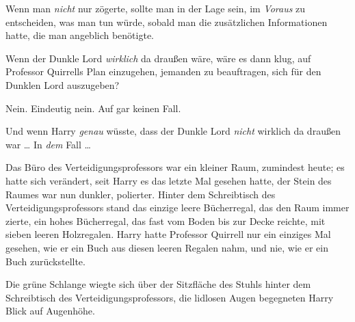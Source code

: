 Wenn man \emph{nicht} nur zögerte, sollte man in der Lage sein, im \emph{Voraus} zu entscheiden, was man tun würde, sobald man die zusätzlichen Informationen hatte, die man angeblich benötigte.

Wenn der Dunkle Lord \emph{wirklich} da draußen wäre, wäre es dann klug, auf Professor Quirrells Plan einzugehen, jemanden zu beauftragen, sich für den Dunklen Lord auszugeben?

Nein. Eindeutig nein. Auf gar keinen Fall.

Und wenn Harry \emph{genau} wüsste, dass der Dunkle Lord \emph{nicht} wirklich da draußen war … In \emph{dem} Fall …

Das Büro des Verteidigungsprofessors war ein kleiner Raum, zumindest heute; es hatte sich verändert, seit Harry es das letzte Mal gesehen hatte, der Stein des Raumes war nun dunkler, polierter. Hinter dem Schreibtisch des Verteidigungsprofessors stand das einzige leere Bücherregal, das den Raum immer zierte, ein hohes Bücherregal, das fast vom Boden bis zur Decke reichte, mit sieben leeren Holzregalen. Harry hatte Professor Quirrell nur ein einziges Mal gesehen, wie er ein Buch aus diesen leeren Regalen nahm, und nie, wie er ein Buch zurückstellte.

Die grüne Schlange wiegte sich über der Sitzfläche des Stuhls hinter dem Schreibtisch des Verteidigungsprofessors, die lidlosen Augen begegneten Harry Blick auf Augenhöhe.

